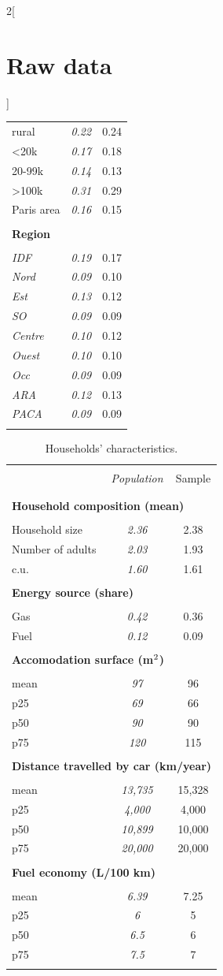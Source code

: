 \documentclass[12pt]{article} %
\begin{document}
\begin{appendices}
\begin{multicols}{2}[\section{Raw data\label{sec:Raw-Data}}]
\begin{table}[H]
\begin{tabular}{lcc}
rural & \emph{0.22} & 0.24\tabularnewline
<20k & \emph{0.17} & 0.18\tabularnewline
20-99k & \emph{0.14} & 0.13\tabularnewline
>100k & \emph{0.31} & 0.29\tabularnewline
Paris area & \emph{0.16} & 0.15\tabularnewline
\hline  \\[-1.8ex]
\textbf{Region} &  & \tabularnewline  \\[-1.8ex]
\emph{IDF} & \emph{0.19} & 0.17\tabularnewline
 \emph{Nord} & \emph{0.09} & 0.10\tabularnewline
 \emph{Est} & \emph{0.13} & 0.12\tabularnewline
\emph{SO} & \emph{0.09} & 0.09\tabularnewline
\emph{Centre} & \emph{0.10} & 0.12\tabularnewline
 \emph{Ouest} & \emph{0.10} & 0.10\tabularnewline
 \emph{Occ} & \emph{0.09} & 0.09\tabularnewline
\emph{ARA} & \emph{0.12} & 0.13\tabularnewline
\emph{PACA} & \emph{0.09} & 0.09\tabularnewline  \\[-1.8ex]
\hline \hline 
\end{tabular}\bigskip{}
\end{table}


\begin{table}[H]
    \caption{Households' characteristics.\label{tab:app-energetic-characs}}
\centering
\begin{tabular}{lcc}
\hline \hline  \\[-1.8ex]
 & \emph{Population} & Sample  \tabularnewline \\[-1.8ex]
\hline  \\[-1.8ex]
\multicolumn{3}{l}{\textbf{Household composition (mean)}} \tabularnewline  \\[-1.8ex]
Household size & \emph{2.36} & 2.38\tabularnewline
Number of adults & \emph{2.03} & 1.93\tabularnewline
c.u. & \emph{1.60} & 1.61\tabularnewline
\hline   \\[-1.8ex]
\multicolumn{3}{l}{\textbf{Energy source (share)}} \tabularnewline  \\[-1.8ex]
Gas & \emph{0.42} & 0.36\tabularnewline
Fuel & \emph{0.12} & 0.09\tabularnewline
\hline   \\[-1.8ex]
\multicolumn{3}{l}{\textbf{Accomodation surface (m$^\textnormal{2}$)}} \tabularnewline  \\[-1.8ex]
mean & \emph{97} & 96\tabularnewline
p25 & \emph{69} & 66\tabularnewline
p50 & \emph{90} & 90\tabularnewline
p75 & \emph{120} & 115\tabularnewline
\hline   \\[-1.8ex]
\multicolumn{3}{l}{\textbf{Distance travelled by car (km/year)}} \tabularnewline  \\[-1.8ex]
mean & \emph{13,735} & 15,328\tabularnewline
p25 & \emph{4,000} & 4,000\tabularnewline
p50 & \emph{10,899} & 10,000 \tabularnewline
p75 & \emph{20,000 } & 20,000 \tabularnewline
\hline   \\[-1.8ex]
\multicolumn{3}{l}{\textbf{Fuel economy (L/100 km)}} \tabularnewline  \\[-1.8ex]
mean & \emph{6.39} & 7.25\tabularnewline
p25 & \emph{6} & 5\tabularnewline
p50 & \emph{6.5} & 6\tabularnewline
p75 & \emph{7.5} & 7\tabularnewline  \\[-1.8ex]
\hline \hline 
\end{tabular}\bigskip{}


\end{table}
\end{multicols}
\end{appendices}
\end{document}
